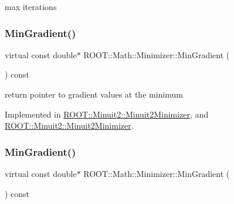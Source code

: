 max iterations 

\mbox{\label{classROOT_1_1Math_1_1Minimizer_a861036d38a21d9a60d44e068397307af}} 
\subsubsection{\texorpdfstring{MinGradient()}{MinGradient()}\hspace{0.1cm}{\footnotesize\ttfamily [1/2]}}
{\footnotesize\ttfamily virtual const double$\ast$ R\+O\+O\+T\+::\+Math\+::\+Minimizer\+::\+Min\+Gradient (\begin{DoxyParamCaption}{ }\end{DoxyParamCaption}) const\hspace{0.3cm}{\ttfamily [pure virtual]}}



return pointer to gradient values at the minimum 



Implemented in \mbox{\hyperlink{classROOT_1_1Minuit2_1_1Minuit2Minimizer_a52c6b3a13108b64366b1acd43f7e2b9a}{R\+O\+O\+T\+::\+Minuit2\+::\+Minuit2\+Minimizer}}, and \mbox{\hyperlink{classROOT_1_1Minuit2_1_1Minuit2Minimizer_a52c6b3a13108b64366b1acd43f7e2b9a}{R\+O\+O\+T\+::\+Minuit2\+::\+Minuit2\+Minimizer}}.

\mbox{\label{classROOT_1_1Math_1_1Minimizer_a861036d38a21d9a60d44e068397307af}} 
\subsubsection{\texorpdfstring{MinGradient()}{MinGradient()}\hspace{0.1cm}{\footnotesize\ttfamily [2/2]}}
{\footnotesize\ttfamily virtual const double$\ast$ R\+O\+O\+T\+::\+Math\+::\+Minimizer\+::\+Min\+Gradient (\begin{DoxyParamCaption}{ }\end{DoxyParamCaption}) const\hspace{0.3cm}{\ttfamily [pure virtual]}}



